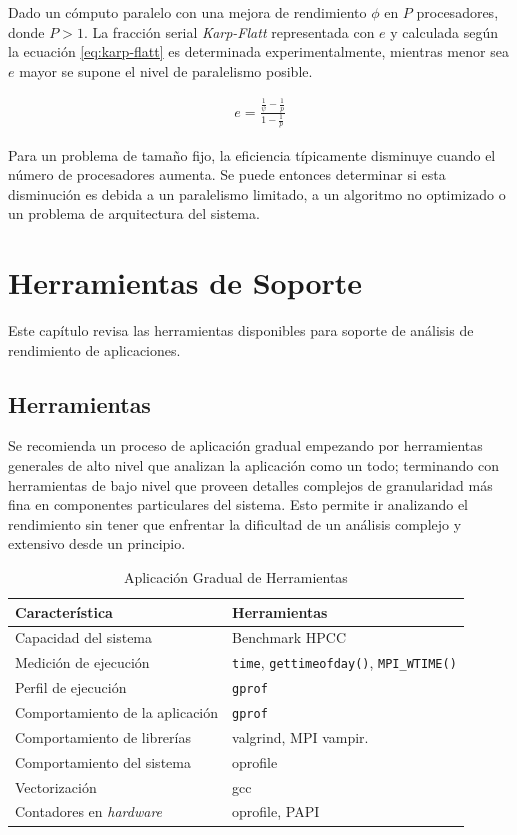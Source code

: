 \documentclass[a4paper]{report}
\begin{document}
\bigskip

Dado un c\'omputo paralelo con una mejora de rendimiento $ \phi $ en $ P $
procesadores, donde $ P > 1 $. La fracci\'on serial {\it Karp-Flatt}
representada con $ e $ y calculada seg\'un la ecuaci\'on \ref{eq:karp-flatt}
es determinada experimentalmente, mientras menor sea $ e $
mayor se supone el nivel de paralelismo posible.

\begin{eqnarray}
\label{eq:karp-flatt}
 e = \frac{\frac{1}{\psi} - \frac{1}{p}}{1 - \frac{1}{p}} 
\end{eqnarray}

Para un problema de tama\~no fijo, la eficiencia t\'ipicamente disminuye cuando
el n\'umero de procesadores aumenta. Se puede entonces determinar si esta disminuci\'on
es debida a un paralelismo limitado, a un algoritmo no optimizado o un problema de
arquitectura del sistema.

\chapter{Herramientas de Soporte}

Este cap\'itulo revisa las herramientas disponibles para soporte de an\'alisis
de rendimiento de aplicaciones.

\section{Herramientas}

Se recomienda un proceso de aplicaci\'on gradual empezando por herramientas generales de alto nivel que analizan la aplicaci\'on como un todo; terminando con herramientas de bajo nivel que proveen detalles complejos de granularidad m\'as fina en componentes particulares del sistema. Esto permite ir analizando el rendimiento sin tener que enfrentar la dificultad de un an\'alisis complejo y extensivo desde un principio.

\begin{table}[H]
\caption{Aplicaci\'on Gradual de Herramientas}
\begin{tabular}{|l|l|} \hline
{\bf Caracter\'istica} & {\bf Herramientas} \\ \hline
Capacidad del sistema & Benchmark HPCC \\ \hline
Medici\'on de ejecuci\'on & {\tt time}, {\tt gettimeofday()}, {\tt MPI\_WTIME()} \\ \hline
Perfil de ejecuci\'on & {\tt gprof} \\ \hline
Comportamiento de la aplicaci\'on & {\tt gprof} \\ \hline
Comportamiento de librer\'ias & valgrind, MPI vampir. \\ \hline
Comportamiento del sistema & oprofile \\ \hline
Vectorizaci\'on & gcc \\ \hline
Contadores en {\it hardware} & oprofile, PAPI \\ \hline
\end{tabular}
\label{table:tools}
\end{table}
\end{document}

